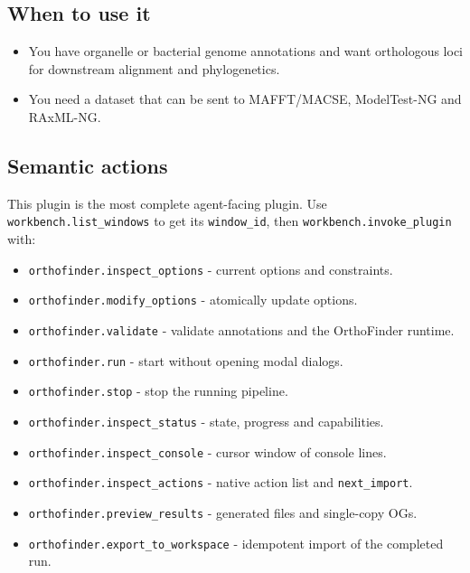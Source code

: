 \documentclass[11pt]{report}
\begin{document}
\subsection{When to use it}

\begin{itemize}
  \item You have organelle or bacterial genome annotations and want orthologous loci for downstream alignment and phylogenetics.
  \item You need a dataset that can be sent to MAFFT/MACSE, ModelTest-NG and RAxML-NG.
\end{itemize}

\subsection{Semantic actions}

This plugin is the most complete agent-facing plugin. Use \texttt{workbench.\allowbreak list\_\allowbreak windows} to get its \texttt{window\_\allowbreak id}, then \texttt{workbench.\allowbreak invoke\_\allowbreak plugin} with:

\begin{itemize}
  \item \texttt{orthofinder.\allowbreak inspect\_\allowbreak options} - current options and constraints.
  \item \texttt{orthofinder.\allowbreak modify\_\allowbreak options} - atomically update options.
  \item \texttt{orthofinder.\allowbreak validate} - validate annotations and the OrthoFinder runtime.
  \item \texttt{orthofinder.\allowbreak run} - start without opening modal dialogs.
  \item \texttt{orthofinder.\allowbreak stop} - stop the running pipeline.
  \item \texttt{orthofinder.\allowbreak inspect\_\allowbreak status} - state, progress and capabilities.
  \item \texttt{orthofinder.\allowbreak inspect\_\allowbreak console} - cursor window of console lines.
  \item \texttt{orthofinder.\allowbreak inspect\_\allowbreak actions} - native action list and \texttt{next\_\allowbreak import}.
  \item \texttt{orthofinder.\allowbreak preview\_\allowbreak results} - generated files and single-copy OGs.
  \item \texttt{orthofinder.\allowbreak export\_\allowbreak to\_\allowbreak workspace} - idempotent import of the completed run.
\end{itemize}
\end{document}
